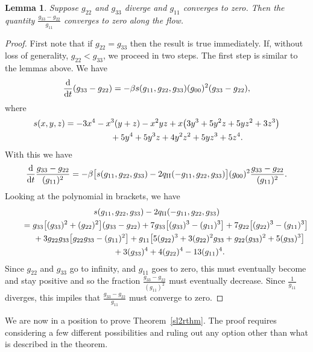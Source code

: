 \documentclass[pdftex]{sigma}
\numberwithin{equation}{section}
\newtheorem{Lemma}[Theorem]{Lemma}
\newcommand{\dtime}{\frac{{\rm d}}{{\rm d} t}} %
\begin{document}
\begin{Lemma} \label{sl2difftozerolemma}Suppose $g_{22}$ and $g_{33}$ diverge and $g_{11}$ converges to zero. Then the quantity $\frac{g_{33} - g_{22}}{g_{11}}$ converges to zero along the flow.
\end{Lemma}

\begin{proof}First note that if $g_{22} = g_{33}$ then the result is true immediately. If, without loss of generality, $g_{22} < g_{33}$, we proceed in two steps. The first step is similar to the lemmas above. We have
\[
\dtime (g_{33} - g_{22}) = -\beta s(g_{11}, g_{22}, g_{33}) (g_{00})^2 (g_{33}-g_{22}),
\]
where
\begin{gather*}
s(x, y, z) = -3x^4 - x^3(y + z) - x^2yz + x\big(3y^3 + 5y^2z + 5yz^2 + 3z^3\big) \\
\hphantom{s(x, y, z) =}{} + 5y^4 + 5y^3z + 4y^2z^2 + 5yz^3 + 5z^4.
\end{gather*}
With this we have
\[
\dtime \frac{g_{33} - g_{22}}{(g_{11})^2}
	= - \beta \big[s(g_{11}, g_{22}, g_{33}) - 2q_{\rm II}(-g_{11}, g_{22}, g_{33}) \big]
		(g_{00})^2 \frac{g_{33} - g_{22}}{(g_{11})^2}.
\]
Looking at the polynomial in brackets, we have
\begin{gather*}
s(g_{11}, g_{22}, g_{33}) - 2q_{\rm II}(-g_{11}, g_{22}, g_{33}) \\
\qquad{}= g_{33}\big[(g_{33})^2 + (g_{22})^2\big](g_{33} - g_{22})
	 + 7g_{33}\big[(g_{33})^3 - (g_{11})^3\big] + 7g_{22}\big[(g_{22})^3 - (g_{11})^3\big] \\
\qquad\quad{} + 3g_{22} g_{33}\big[g_{22} g_{33} - (g_{11})^2\big]
	 + g_{11}\big[5(g_{22})^3 + 3(g_{22})^2 g_{33} + g_{22} (g_{33})^2 + 5 (g_{33})^3\big] \\
\qquad\quad{} + 3(g_{33})^4 + 4 (g_{22})^4 - 13 (g_{11})^4.
\end{gather*}
Since $g_{22}$ and $g_{33}$ go to infinity, and $g_{11}$ goes to zero, this must eventually become and stay positive and so the fraction $\frac{g_{33} - g_{22}}{(g_{11})^2}$ must eventually decrease. Since $\frac{1}{g_{11}}$ diverges, this impiles that $\frac{g_{33} - g_{22}}{g_{11}}$ must converge to zero.
\end{proof}

We are now in a position to prove Theorem~\ref{sl2rthm}. The proof requires considering a few different possibilities and ruling out any option other than what is described in the theorem.
\end{document}
